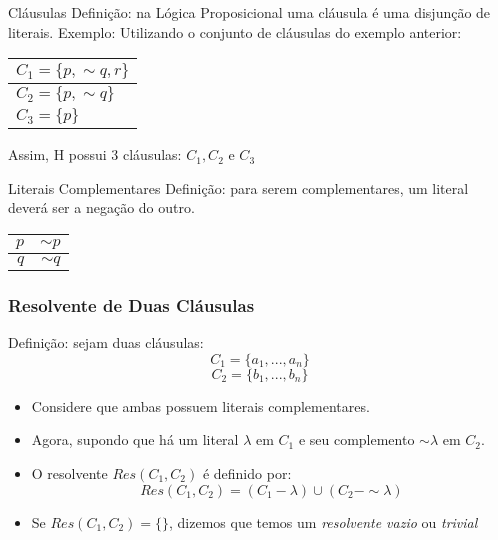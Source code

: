 \begin{frame}{Cláusulas}
Definição: na Lógica Proposicional uma cláusula é uma disjunção de literais.
\vspace{0.5cm}
Exemplo: Utilizando o conjunto de cláusulas do exemplo anterior:
\\
\begin{table}
\centering
\begin{tabular}{l}
\hline
\hline
$C_1 = \{p, \sim q, r\}$\\ \hline
$C_2 = \{p,\sim q\}$\\  \hline
$C_3 = \{p\}$\\
\hline
\hline
\end{tabular}
\end{table}
              
Assim, H possui 3 cláusulas: $C_1,C_2$ e $C_3$

\end{frame}

\begin{frame}{Literais Complementares}
Definição: para serem complementares, um literal deverá ser a negação do outro.
\begin{table}
\centering
\begin{tabular}{r|r}
\hline
\hline
$p$&$\sim p$\\
\hline
$q$&$\sim q$\\
\hline
\hline
\end{tabular}
\end{table}
\end{frame}
\begin{frame}
\frametitle{Resolvente de Duas Cláusulas}

Definição: sejam duas cláusulas:
$$C_1 = \{a_1,...,a_n\} $$ 
$$C_2 = \{b_1,...,b_n\}$$

\begin{itemize}
\item Considere que ambas possuem literais complementares.

\item Agora,  supondo que há um literal $\lambda$
em $C_1$ e  seu complemento $\sim \lambda$ em $C_2$.

\item O resolvente $Res(C_1,C_2)$ é definido por:
\begin{equation}
Res(C_1,C_2) = (C_1 - \lambda) \cup (C_2 - \sim \lambda)
\label{equacao_resolvente}
\end{equation}
\item Se $Res(C_1,C_2) = \{\}$, dizemos que temos um \textit{resolvente vazio} ou \textit{trivial}

\end{itemize}
\end{frame}

